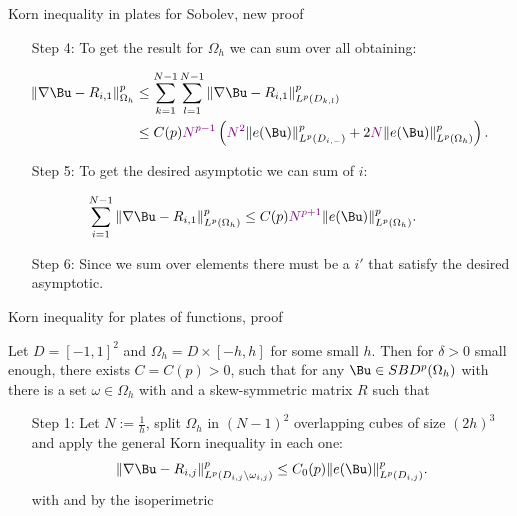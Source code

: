 \documentclass{beamer}
\begin{document}
\begin{frame}{ Korn inequality in plates for Sobolev, new proof}
    \begin{itemize}[leftmargin = 1.5cm]
        \item[Step 4:] To get the result for $\Omega_h$ we can sum over all  obtaining:
    \end{itemize}
    \begin{align*}
        \|\nabla \Bu- R_{i,1}\|^p_{\Omega_h}&\leq\sum_{k=1}^{N-1}\sum_{l=1}^{N-1}\|\nabla \Bu- R_{i,1}\|^p_{L^p(D_{k,l})}  \\
        &\leq C(p)\textcolor{violet}{N^{p-1}}\left(\textcolor{violet}{ N^2} \|e(\Bu)\|^p_{L^p(D_{i,-})} +  2\textcolor{violet}{N}\|e(\Bu)\|^p_{L^p(\Omega_h)}\right).
    \end{align*}
    \pause
    \begin{itemize}[leftmargin = 1.5cm]
        \item[Step 5:] To get the desired asymptotic we can sum of $i$:
    \end{itemize}
    \begin{align*}
        \sum_{i=1}^{N-1} \|\nabla \Bu - R_{i,1}\|^p_{L^p(\Omega_h)}&\leq C(p)\textcolor{violet}{N^{p+1}}\|e(\Bu)\|^p_{L^p(\Omega_h)}.
    \end{align*}
    \pause
    \begin{itemize}[leftmargin = 1.5cm]
        \item[Step 6:] Since we sum over  elements there must be a $i'$ that satisfy the desired asymptotic.
    \end{itemize}
\end{frame}
\begin{frame}{Korn inequality for plates  of  functions, proof}
    \begin{theorem} Let $D=[-1,1]^2$ and $\Omega_h = D\times[-h,h]$ for some small $h$. Then for $\delta>0$ small enough, there exists $C = C(p)>0$, such that for any $\Bu\in SBD^p(\Omega_h)$ with  there is a set $\omega\in\Omega_h$ with   and a skew-symmetric matrix $R$ such that
    \end{theorem}
    \pause
    \vfill
\begin{itemize}[leftmargin = 1.5cm]
    \item[Step 1:] Let $N:= \frac{1}{h}$, split $\Omega_h$ in $(N-1)^2$  overlapping cubes of size $(2h)^3$ and apply the general Korn inequality in each one:
    \begin{equation*}\label{kornkj}
    \|\nabla \Bu- R_{i,j}\|^p_{L^p(D_{i,j}\backslash \omega_{i,j})} \leq C_0(p) \|e(\Bu)\|^p_{L^p(D_{i,j})}.
    \end{equation*}
    with  and by the isoperimetric 
\end{itemize}
\end{frame}
\end{document}
